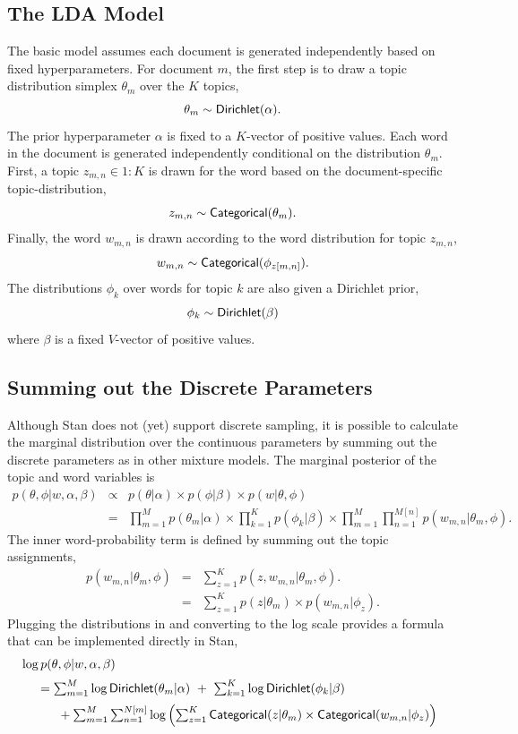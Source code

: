 \subsection{The LDA Model}

The basic model assumes each document is generated independently based
on fixed hyperparameters. For document $m$, the first step is to draw a topic
distribution simplex $\theta_m$ over the $K$ topics,
%
\[
\theta_m \sim \distro{Dirichlet}(\alpha).
\]
%
The prior hyperparameter $\alpha$ is fixed to a $K$-vector of positive
values.  Each word in the document is generated independently
conditional on the distribution $\theta_m$.  First, a topic
$z_{m,n} \in 1{:}K$ is drawn for the word based on the
document-specific topic-distribution,
\[
z_{m,n} \sim \distro{Categorical}(\theta_m).
\]
%
Finally, the word $w_{m,n}$ is drawn according to the word distribution
for topic $z_{m,n}$,
\[
w_{m,n} \sim \distro{Categorical}(\phi_{z[m,n]}).
\]
The distributions $\phi_k$ over words for topic $k$ are also given a
Dirichlet prior,
\[
\phi_k \sim \distro{Dirichlet}(\beta)
\]
%
where $\beta$ is a fixed $V$-vector of positive values.

\subsection{Summing out the Discrete Parameters}

Although Stan does not (yet) support discrete sampling, it is possible
to calculate the marginal distribution over the continuous parameters
by summing out the discrete parameters as in other mixture models.
The marginal posterior of the topic and word variables is
%
\begin{eqnarray*}
p(\theta,\phi|w,\alpha,\beta)
& \propto & 
p(\theta|\alpha) \times p(\phi|\beta) \times p(w|\theta,\phi)
\\[4pt]
& = & 
\prod_{m=1}^M p(\theta_m|\alpha)
\times
\prod_{k=1}^K p(\phi_k|\beta)
\times
\prod_{m=1}^M \prod_{n=1}^{M[n]} p(w_{m,n}|\theta_m,\phi).
\end{eqnarray*}
%
The inner word-probability term is defined by summing out the
topic assignments,
\begin{eqnarray*}
p(w_{m,n}|\theta_m,\phi)
& = &
\sum_{z=1}^K p(z,w_{m,n}|\theta_m,\phi).
\\[4pt]
& = &
\sum_{z=1}^K p(z|\theta_m) \times p(w_{m,n}|\phi_z).
\end{eqnarray*}
%
Plugging the distributions in and converting to the log scale provides a
formula that can be implemented directly in Stan,
\[
\begin{array}{l}
\log p(\theta,\phi|w,\alpha,\beta)
\\[6pt]
{ } \ \ 
\begin{array}{l}
{ } = \sum_{m=1}^M \log \distro{Dirichlet}(\theta_m|\alpha)
\ + \
\sum_{k=1}^K \log \distro{Dirichlet}(\phi_k|\beta)
\\[6pt]
{ } \ \ \ \ \
+ \sum_{m=1}^M \sum_{n=1}^{N[m]} \log \left( 
\sum_{z=1}^K
  \distro{Categorical}(z|\theta_m) 
   \times \distro{Categorical}(w_{m,n}|\phi_z)
 \right)
\end{array}
\end{array}
\]

